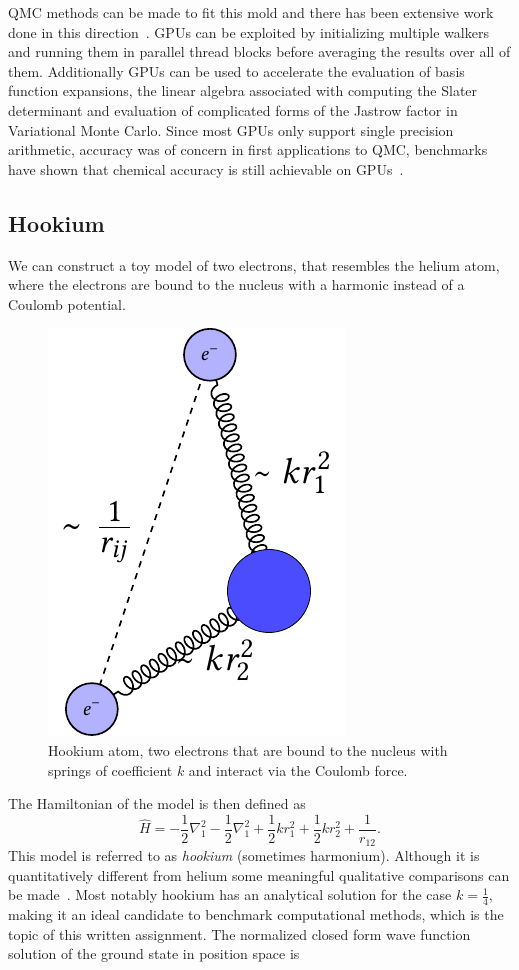 \documentclass[final,3p,times,twocolumn]{elsarticle}
\begin{document}
	QMC methods can be made to fit this mold and there has been extensive work done in this direction~\cite{anderson2007quantum, meredith2009accuracy, esler2010accelerating}. GPUs can be exploited by initializing multiple walkers and running them in parallel thread blocks before averaging the results over all of them. Additionally GPUs can be used to accelerate the evaluation of basis function expansions, the linear algebra associated with computing the Slater determinant and evaluation of complicated forms of the Jastrow factor in Variational Monte Carlo. Since most GPUs only support single precision arithmetic, accuracy was of concern in first applications to QMC, benchmarks have shown that chemical accuracy is still achievable on GPUs~\cite{anderson1975random, meredith2009accuracy}. 
	
	
	\subsection{Hookium}
	We can construct a toy model of two electrons, that resembles the helium atom, where the electrons are bound to the nucleus with a harmonic instead of a Coulomb potential. 
	\begin{figure}[h]
		\centering
		\includegraphics[width=0.35\linewidth]{../diagrams/Hookium/hookium_diagram}
		\caption{Hookium atom, two electrons that are bound to the nucleus with springs of coefficient $k$ and interact via the Coulomb force.}
		\label{fig:hookiumdiagram}
	\end{figure}
	The Hamiltonian of the model is then defined as 
	\begin{equation}
		\hat{H}=-\frac{1}{2} \nabla_{1}^{2}-\frac{1}{2} \nabla_{1}^{2}+\frac{1}{2} k r_{1}^{2}+\frac{1}{2} k r_{2}^{2}+\frac{1}{r_{12}}.
	\end{equation}
	This model is referred to as \emph{hookium} (sometimes harmonium). Although it is quantitatively different from helium some meaningful qualitative comparisons can be made~\cite{ONeill2003wave}. Most notably hookium has an analytical solution for the case $k=\frac{1}{4}$, making it an ideal candidate to benchmark computational methods, which is the topic of this written assignment. The normalized closed form wave function solution of the ground state in position space is
\end{document}
